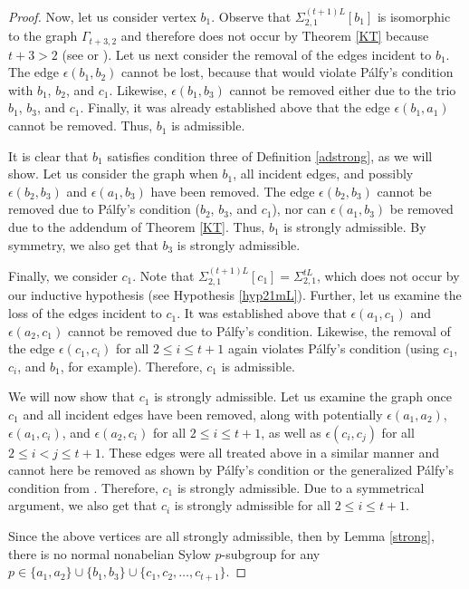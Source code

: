 \documentclass[11pt]{amsart}
\theoremstyle{definition}
\theoremstyle{remark}
\numberwithin{equation}{section}
\newcommand{\SLi}[3]{\Sigma_{#1,#2}^{#3L}} %
\begin{document}
\begin{proof}
Now, let us consider vertex $b_1$. Observe that $\SLi{2}{1}{(t+1)}[b_1]$ is isomorphic to the graph $\Gamma_{t+3,2}$ and therefore does not occur by Theorem \ref{KT} because $t+3>2$ (see \cite{BL} or \cite{BLL2}). Let us next consider the removal of the edges incident to $b_1$. The edge $\epsilon(b_1,b_2)$ cannot be lost, because that would violate P\'alfy's condition with $b_1$, $b_2$, and $c_1$. Likewise, $\epsilon(b_1,b_3)$ cannot be removed either due to the trio $b_1$, $b_3$, and $c_1$. Finally, it was already established above that the edge $\epsilon(b_1,a_1)$ cannot be removed. Thus, $b_1$ is admissible.

It is clear that $b_1$ satisfies condition three of Definition \ref{adstrong}, as we will show. Let us consider the graph when $b_1$, all incident edges, and possibly $\epsilon(b_2,b_3)$ and $\epsilon(a_1,b_3)$ have been removed. The edge $\epsilon(b_2,b_3)$ cannot be removed due to P\'alfy's condition ($b_2$, $b_3$, and $c_1$), nor can $\epsilon(a_1,b_3)$ be removed due to the addendum of Theorem \ref{KT}. Thus, $b_1$ is strongly admissible. By symmetry, we also get that $b_3$ is strongly admissible.

Finally, we consider $c_1$. Note that $\SLi{2}{1}{(t+1)}[c_1]=\SLi{2}{1}{t}$, which does not occur by our inductive hypothesis (see Hypothesis \ref{hyp21mL}). Further, let us examine the loss of the edges incident to $c_1$. It was established above that $\epsilon(a_1,c_1)$ and $\epsilon(a_2,c_1)$ cannot be removed due to P\'alfy's condition. Likewise, the removal of the edge $\epsilon(c_1,c_i)$ for all $2\leq i\leq t+1$ again violates P\'alfy's condition (using $c_1$, $c_i$, and $b_1$, for example). Therefore, $c_1$ is admissible.

We will now show that $c_1$ is strongly admissible. Let us examine the graph once $c_1$ and all incident edges have been removed, along with potentially $\epsilon(a_1,a_2)$, $\epsilon(a_1,c_i)$, and $\epsilon(a_2,c_i)$ for all $2\leq i\leq t+1$, as well as $\epsilon(c_i,c_j)$ for all $2\leq i<j\leq t+1$. These edges were all treated above in a similar manner and cannot here be removed as shown by P\'alfy's condition or the generalized P\'alfy's condition from \cite{A}. Therefore, $c_1$ is strongly admissible. Due to a symmetrical argument, we also get that $c_i$ is strongly admissible for all $2\leq i\leq t+1$.

Since the above vertices are all strongly admissible, then by Lemma \ref{strong}, there is no normal nonabelian Sylow $p$-subgroup for any $p\in\{a_1,a_2\}\cup\{b_1,b_3\}\cup\{c_1,c_2,\ldots,c_{t+1}\}$.
\end{proof}
\end{document}
